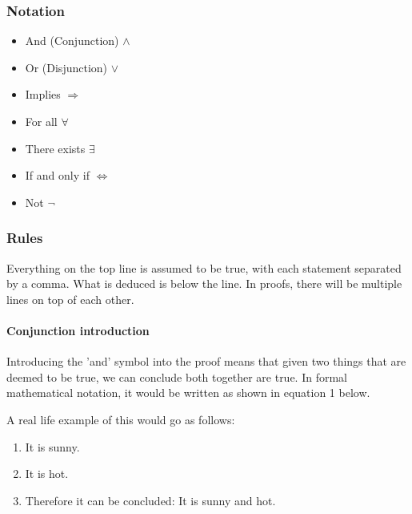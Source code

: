 \documentclass[a4paper]{article}
\begin{document}
\subsubsection{Notation}
\begin{itemize}
\item{And (Conjunction) $\wedge$}
\item{Or (Disjunction) $\vee$}
\item{Implies $\Rightarrow$}
\item{For all $\forall$}
\item{There exists $\exists$}
\item{If and only if $\Leftrightarrow$}
\item{Not $\lnot$}
\end{itemize}
\cite{intro}
\subsubsection{Rules}

Everything on the top line is assumed to be true, with each statement separated by a comma. What is deduced is below the line. In proofs, there will be multiple lines on top of each other.

\paragraph{Conjunction introduction}

Introducing the 'and' symbol into the proof means that given two things that are deemed to be true, we can conclude both together are true. In formal mathematical notation, it would be written as shown in equation 1 below.

\bigskip \centerline{}
\bigskip
A real life example of this would go as follows:
\begin{enumerate}
\item{It is sunny.}
\item{It is hot.}
\item{Therefore it can be concluded: It is sunny and hot.}
\end{enumerate}
\end{document}
